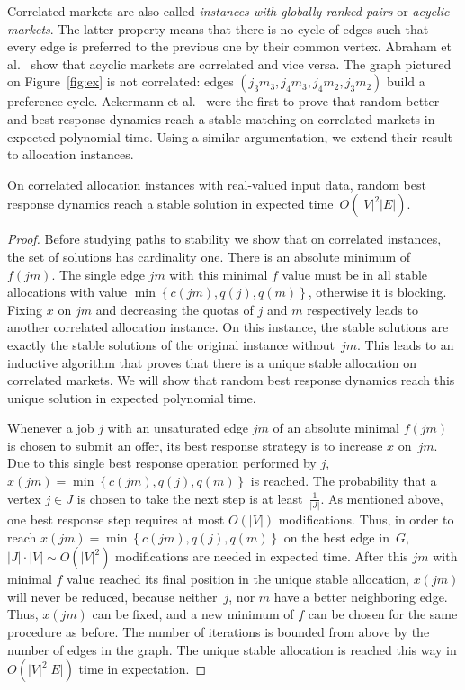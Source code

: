 \documentclass{llncs}
\begin{document}
Correlated markets are also called \emph{instances with globally ranked pairs} or \emph{acyclic markets}. The latter property means that there is no cycle of edges such that every edge is preferred to the previous one by their common vertex. Abraham et al.~\cite{enlighten4494} show that acyclic markets are correlated and vice versa. The graph pictured on Figure~\ref{fig:ex} is not correlated: edges $(j_3m_3, j_4m_3, j_4m_2, j_3m_2)$ build a preference cycle.
Ackermann et al.~\cite{ackermann2011uncoordinated} were the first to prove that random better and best response dynamics reach a stable matching on correlated markets in expected polynomial time. Using a similar argumentation, we extend their result to allocation instances.

\begin{theorem}
\label{th:cor}
On correlated allocation instances with real-valued input data, random best response dynamics reach a stable solution in expected time~$O(|V|^2 |E|)$.
\end{theorem}

\begin{proof}
	Before studying paths to stability we show that on correlated instances, the set of solutions has cardinality one. There is an absolute minimum of~$f(jm)$. The single edge $jm$ with this minimal $f$ value must be in all stable allocations with value $\min{\left\{c(jm), q(j), q(m)\right\}}$, otherwise it is blocking. Fixing $x$ on $jm$ and decreasing the quotas of $j$ and $m$ respectively leads to another correlated allocation instance. On this instance, the stable solutions are exactly the stable solutions of the original instance without~$jm$. This leads to an inductive algorithm that proves that there is a unique stable allocation on correlated markets. We will show that random best response dynamics reach this unique solution in expected polynomial time.

	Whenever a job $j$ with an unsaturated edge $jm$ of an absolute minimal $f(jm)$ is chosen to submit an offer, its best response strategy is to increase $x$ on~$jm$. Due to this single best response operation performed by $j$, $x(jm)=\min{\left\{c(jm), q(j), q(m)\right\}}$ is reached. The probability that a vertex $j \in J$ is chosen to take the next step is at least~$\frac{1}{|J|}$. As mentioned above, one best response step requires at most $O(|V|)$ modifications. Thus, in order to reach $x(jm)=\min{\left\{c(jm), q(j), q(m)\right\}}$ on the best edge in~$G$, $|J| \cdot |V| \sim O(|V|^2)$ modifications are needed in expected time. After this $jm$ with minimal $f$ value reached its final position in the unique stable allocation, $x(jm)$ will never be reduced, because neither~$j$, nor $m$ have a better neighboring edge. Thus, $x(jm)$ can be fixed, and a new minimum of $f$ can be chosen for the same procedure as before. The number of iterations is bounded from above by the number of edges in the graph. The unique stable allocation is reached this way in $O(|V|^2 |E|)$ time in expectation.\end{proof}
\end{document}
